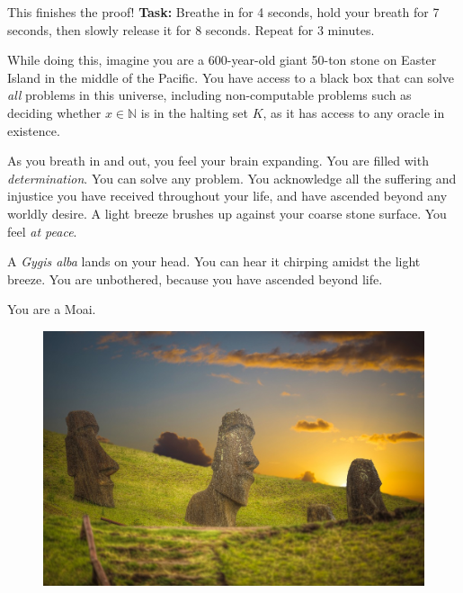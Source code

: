 \documentclass{beamer}
\begin{document}
\begin{frame}{This finishes the proof!}
\textbf{Task:} Breathe in for 4 seconds, hold your breath for 7 seconds, then slowly release it for 8 seconds. Repeat for 3 minutes. 

\vspace{2mm}

While doing this, imagine you are a 600-year-old giant 50-ton stone on Easter Island in the middle of the Pacific. You have access to a black box that can solve \textit{all} problems in this universe, including non-computable problems such as deciding whether $x \in \mathbb N$ is in the halting set $K$, as it has access to any oracle in existence.

As you breath in and out, you feel your brain expanding. You are filled with \textit{determination}. You can solve any problem. You acknowledge all the suffering and injustice you have received throughout your life, and have ascended beyond any worldly desire. A light breeze brushes up against your coarse stone surface. You feel \textit{at peace}. 

A \textit{Gygis alba} lands on your head. You can hear it chirping amidst the light breeze. You are unbothered, because you have ascended beyond life.

You are a Moai. \emojimoyai\emojimoyai\emojimoyai


\end{frame}

\begin{frame}{\emojimoyai\emojimoyai\emojimoyai\emojimoyai\emojimoyai\emojimoyai}

\begin{figure}[h]
\centering
\includegraphics{img/moai.jpg}
\end{figure}


\end{frame}
\end{document}
